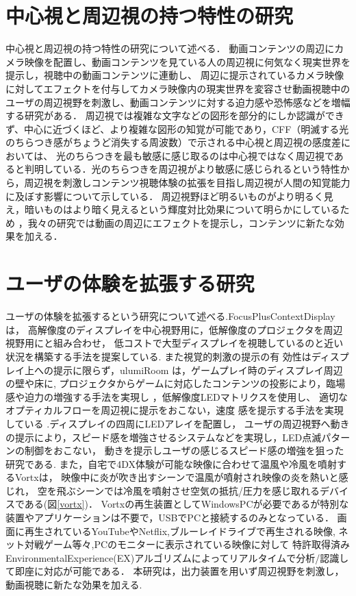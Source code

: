 \section{中心視と周辺視の持つ特性の研究}
中心視と周辺視の持つ特性の研究について述べる．
動画コンテンツの周辺にカメラ映像を配置し、動画コンテンツを見ている人の周辺視に何気なく現実世界を提示し，視聴中の動画コンテンツに連動し、
周辺に提示されているカメラ映像に対してエフェクトを付与してカメラ映像内の現実世界を変容させ動画視聴中のユーザの周辺視野を刺激し、動画コンテンツに対する迫力感や恐怖感などを増幅する研究がある\cite{shamo4}．
周辺視では複雑な文字などの図形を部分的にしか認識ができず、中心に近づくほど、より複雑な図形の知覚が可能であり\cite{shamo5}，CFF（明滅する光のちらつき感がちょうど消失する周波数）で示される中心視と周辺視の感度差においては、
光のちらつきを最も敏感に感じ取るのは中心視ではなく周辺視であると判明している\cite{shamo6}．光のちらつきを周辺視がより敏感に感じられるという特性から，周辺視を刺激しコンテンツ視聴体験の拡張を目指し周辺視が人間の知覚能力に及ぼす影響について示している\cite{shamo7}．
周辺視野ほど明るいものがより明るく見え，暗いものはより暗く見えるという輝度対比効果について明らかにしているため \cite{shamo8}，我々の研究では動画の周辺にエフェクトを提示し，コンテンツに新たな効果を加える．

\section{ユーザの体験を拡張する研究}     
ユーザの体験を拡張するという研究について述べる.FocusPlusContextDisplayは，
高解像度のディスプレイを中心視野用に，低解像度のプロジェクタを周辺視野用にと組み合わせ，
低コストで大型ディスプレイを視聴しているのと近い状況を構築する手法を提案している\cite{shamo9}.
また視覚的刺激の提示の有 効性はディスプレイ上への提示に限らず，ulumiRoom は，ゲームプレイ時のディスプレイ周辺の壁や床に,
プロジェクタからゲームに対応したコンテンツの投影により，臨場感や迫力の増強する手法を実現し \cite{shamo10}，低解像度LEDマトリクスを使用し、
適切なオプティカルフローを周辺視に提示をおこない，速度 感を提示する手法を実現している \cite{shamo11}.ディスプレイの四周にLEDアレイを配置し，
ユーザの周辺視野へ動きの提示により，スピード感を増強させるシステムなどを実現し，LED点滅パターンの制御をおこない，
動きを提示しユーザの感じるスピード感の増強を狙った研究である\cite{shamo12}.
また，自宅で4DX体験が可能な映像に合わせて温風や冷風を噴射するVortxは，
映像中に炎が吹き出すシーンで温風が噴射され映像の炎を熱いと感じれ，
空を飛ぶシーンでは冷風を噴射させ空気の抵抗/圧力を感じ取れるデバイスである(図\ref{vortx})．
Vortxの再生装置としてWindowsPCが必要であるが特別な装置やアプリケーションは不要で，USBでPCと接続するのみとなっている．
画面に再生されているYouTubeやNetflix,ブルーレイドライブで再生される映像,
ネット対戦ゲーム等々,PCのモニターに表示されている映像に対して
特許取得済みEnvironmentalExperience(EX)アルゴリズムによってリアルタイムで分析/認識して即座に対応が可能である\cite{vortx}．
本研究は，出力装置を用いず周辺視野を刺激し，動画視聴に新たな効果を加える. 

